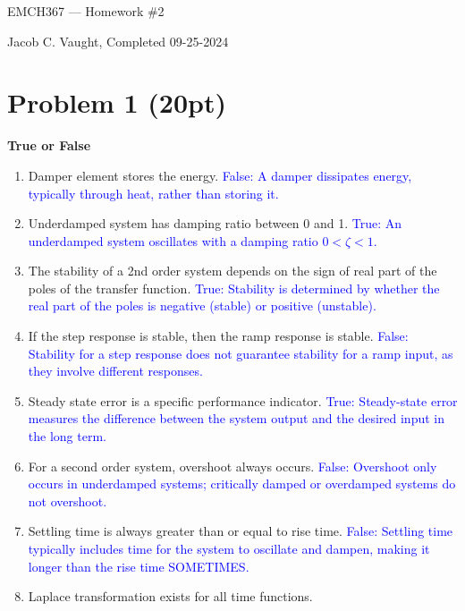 \documentclass{article}
\begin{document}
\begin{center}
	{\Huge EMCH367 --- Homework \#2}
\end{center}
Jacob C. Vaught, Completed 09-25-2024

\section*{Problem 1 (20pt)}
\textbf{True or False}
\begin{enumerate}
	\item Damper element stores the energy. \newline
	      \textcolor{blue}{False: A damper dissipates energy, typically through heat, rather than storing it.}
	\item Underdamped system has damping ratio between 0 and 1. \newline
	      \textcolor{blue}{True: An underdamped system oscillates with a damping ratio \( 0 < \zeta < 1 \).}
	\item The stability of a 2nd order system depends on the sign of real part of the poles of the transfer function. \newline
	      \textcolor{blue}{True: Stability is determined by whether the real part of the poles is negative (stable) or positive (unstable).}
	\item If the step response is stable, then the ramp response is stable. \newline
	      \textcolor{blue}{False: Stability for a step response does not guarantee stability for a ramp input, as they involve different responses.}
	\item Steady state error is a specific performance indicator. \newline
	      \textcolor{blue}{True: Steady-state error measures the difference between the system output and the desired input in the long term.}
	\item For a second order system, overshoot always occurs. \newline
	      \textcolor{blue}{False: Overshoot only occurs in underdamped systems; critically damped or overdamped systems do not overshoot.}
	\item Settling time is always greater than or equal to rise time. \newline
	      \textcolor{blue}{False: Settling time typically includes time for the system to oscillate and dampen, making it longer than the rise time SOMETIMES.}
	\item Laplace transformation exists for all time functions. \newline

\end{enumerate}
\end{document}

